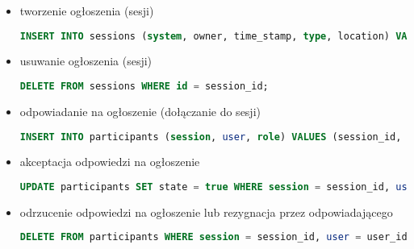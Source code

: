 \begin{itemize}
\clearpage
\item tworzenie ogłoszenia (sesji)
\begin{lstlisting}[language=SQL]
INSERT INTO sessions (system, owner, time_stamp, type, location) VALUES (system_id, current_user, when, ses_type, where);
\end{lstlisting}

\item usuwanie ogłoszenia (sesji)
\begin{lstlisting}[language=SQL]
DELETE FROM sessions WHERE id = session_id;
\end{lstlisting}

\item odpowiadanie na ogłoszenie (dołączanie do sesji)
\begin{lstlisting}[language=SQL]
INSERT INTO participants (session, user, role) VALUES (session_id, current_user, session_role);
\end{lstlisting}

\item akceptacja odpowiedzi na ogłoszenie
\begin{lstlisting}[language=SQL]
UPDATE participants SET state = true WHERE session = session_id, user = user_id;
\end{lstlisting}

\item odrzucenie odpowiedzi na ogłoszenie lub rezygnacja przez odpowiadającego
\begin{lstlisting}[language=SQL]
DELETE FROM participants WHERE session = session_id, user = user_id;
\end{lstlisting}
\end{itemize}